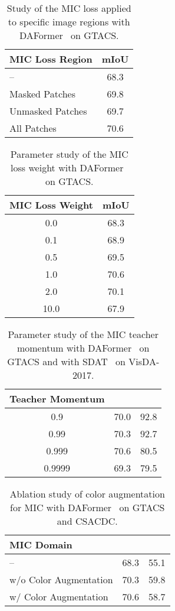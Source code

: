 \documentclass[10pt,twocolumn,letterpaper]{article}
\newcommand*{\z}{\phantom{0}}
\begin{document}
\begin{table}[tb]
\centering
\caption{Study of the MIC loss applied to specific image regions with DAFormer~\cite{hoyer2021daformer} on GTACS.}
\label{tab:mic_pred_region}
\setlength{\tabcolsep}{3pt}
\scriptsize
\begin{tabular}{lc}
\toprule
MIC Loss Region & mIoU \\
\midrule
                   -- & 68.3 \\
        Masked Patches & 69.8 \\
        Unmasked Patches & 69.7 \\
            All Patches & 70.6 \\
\bottomrule
\end{tabular}
\end{table}
 \begin{table}[tb]
\centering
\caption{Parameter study of the MIC loss weight  with DAFormer~\cite{hoyer2021daformer} on GTACS.}
\label{tab:mic_lambda}
\setlength{\tabcolsep}{3pt}
\scriptsize
\begin{tabular}{cc}
\toprule
MIC Loss Weight  & mIoU \\
\midrule
\z0.0 & 68.3 \\
\z0.1 & 68.9 \\
\z0.5 & 69.5 \\
\z1.0 & 70.6 \\
\z2.0 & 70.1 \\
10.0 & 67.9 \\
\bottomrule
\end{tabular}
\end{table}
 \begin{table}[tb]
\centering
\caption{Parameter study of the MIC teacher momentum  with DAFormer~\cite{hoyer2021daformer} on GTACS and with SDAT~\cite{rangwani2022closer} on VisDA-2017.}
\label{tab:mic_alpha}
\setlength{\tabcolsep}{3pt}
\scriptsize
\begin{tabular}{ccc}
\toprule
Teacher Momentum  &  &  \\
\midrule
\z\z\z0.9 & 70.0 & 92.8 \\
\z\z0.99 & 70.3 & 92.7 \\
\z0.999 & 70.6 & 80.5 \\
0.9999 & 69.3 & 79.5\\
\bottomrule
\end{tabular}
\end{table}
 \begin{table}[tb]
\centering
\caption{Ablation study of color augmentation for MIC with DAFormer~\cite{hoyer2021daformer} on GTACS and CSACDC.}
\label{tab:mic_augmentation}
\setlength{\tabcolsep}{3pt}
\scriptsize
\begin{tabular}{lcc}
    \toprule
                MIC Domain &  &  \\
    \midrule
    -- &    68.3 &     55.1 \\
    w/o Color Augmentation &    70.3 &     59.8 \\
     w/ Color Augmentation &    70.6 &     58.7 \\
    \bottomrule
    \end{tabular}
\end{table}
 
\end{document}
